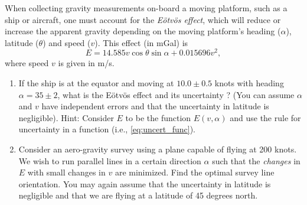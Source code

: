 \begin{problem}
When collecting gravity measurements on-board a moving platform, such as a ship or aircraft, one must account
for the \emph{E{\"o}tv{\"o}s effect}, which will reduce or increase the apparent gravity depending on the moving platform's
heading ($\alpha$), latitude ($\theta$) and speed ($v$).  This effect (in mGal) is
$$
E = 14.585 v \cos \theta \sin \alpha + 0.015696 v^2,
$$
where speed $v$ is given in m/s.
\begin{enumerate}[label=\alph*)]
\item If the ship is at the equator and moving at $10.0 \pm 0.5$ knots with heading $\alpha = 35 \pm 2$\DS,
what is the E{\"o}tv{\"o}s effect and its uncertainty ? (You can assume $\alpha$ and $v$ have independent errors and
that the uncertainty in latitude is negligible).  Hint: Consider $E$ to be the function $E(v, \alpha)$ and use the
rule for uncertainty in a function (i.e., \ref{eq:uncert_func}).
\item Consider an aero-gravity survey using a plane capable of flying at 200 knots.  We wish to run
parallel lines in a certain direction $\alpha$ such that the \emph{changes} in $E$ with small changes in
$v$ are minimized.  Find the optimal survey line orientation.  You may again assume that the uncertainty
in latitude is negligible and that we are flying at a latitude of 45 degrees north.
\end{enumerate}
\end{problem}

